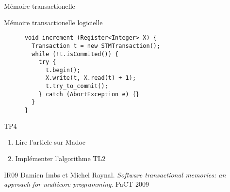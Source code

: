 
\begingroup

\begin{frame}[fragile]{Mémoire transactionelle}
  \vFill
  \begin{block}{Mémoire transactionelle logicielle}
    \begin{lstlisting}
      void increment (Register<Integer> X) {
        Transaction t = new STMTransaction();
        while (!t.isCommited()) {
          try {
            t.begin();
            X.write(t, X.read(t) + 1);
            t.try_to_commit();
          } catch (AbortException e) {}
        }
      }
    \end{lstlisting}
  \end{block}
  \pause
  \begin{alertblock}{TP4}
    \begin{enumerate}
    \item Lire l'article sur Madoc
      
    \item Implémenter l'algorithme TL2
    \end{enumerate}
  \end{alertblock}
  \vFill
  
  \begin{citing}
  \item[IR09] Damien Imbs et Michel Raynal. \textit{Software transactional memories: an approach for multicore programming}. PaCT 2009
  \end{citing}
\end{frame}

\endgroup
\endinput
